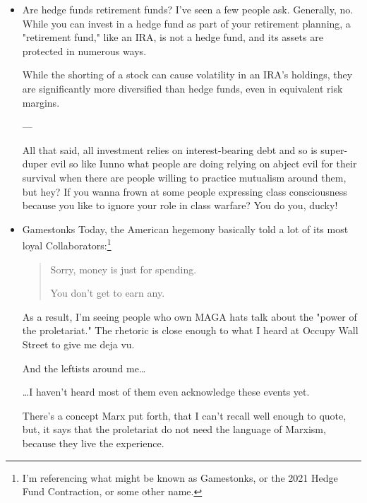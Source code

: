 \documentclass[11pt]{article}
\begin{document}
\begin{itemize}
That is to say: I "must snatch time and space," because "dialogue is inseperable from struggle," and my "critique[s…] must be concrete."

But… why critique, at all?

I'll share the quote that is the epigraph to the last section of "Ai ferri":
\begin{quote}
"Don’t ask for the formula for opening up worlds to you in some syllable like a bent dry branch. Today, we can only tell you what we are not, what we don’t want." - Eugenio Montale
\end{quote}
\item Are hedge funds retirement funds?
\label{sec:org3202243}
I've seen a few people ask.  Generally, no. While you can invest in a hedge fund as part of your retirement planning, a "retirement fund," like an IRA, is not a hedge fund, and its assets are protected in numerous ways.

While the shorting of a stock can cause volatility in an IRA's holdings, they are significantly more diversified than hedge funds, even in equivalent risk margins.

—

All that said, all investment relies on interest-bearing debt and so is super-duper evil so like Iunno what people are doing relying on abject evil for their survival when there are people willing to practice mutualism around them, but hey? If you wanna frown at some people expressing class consciousness because you like to ignore your role in class warfare? You do you, ducky! 
\item Gamestonks
\label{sec:org6657270}
Today, the American hegemony basically told a lot of its most loyal Collaborators:\footnote{I'm referencing what might be known as Gamestonks, or the 2021 Hedge Fund Contraction, or some other name.}

\begin{quote}
Sorry, money is just for spending.

You don't get to earn any.
\end{quote}

As a result, I'm seeing people who own MAGA hats talk about the "power of the proletariat." The rhetoric is close enough to what I heard at Occupy Wall Street to give me deja vu.

And the leftists around me…

…I haven't heard most of them even acknowledge these events yet.

There's a concept Marx put forth, that I can't recall well enough to quote, but, it says that the proletariat do not need the language of Marxism, because they live the experience.


\end{itemize}
\end{document}
